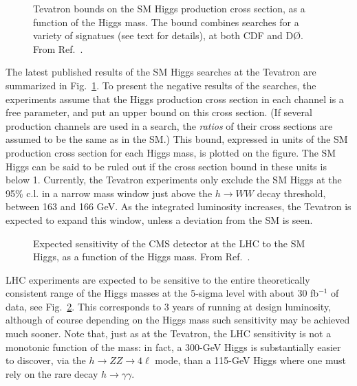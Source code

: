 \documentclass{ws-procs9x6}
\begin{document}
\begin{figure}
\begin{center}
\end{center}
\caption{Tevatron bounds on the SM Higgs production cross section, as a function of the Higgs mass. The bound combines searches for a variety of signatues (see text for details), at both CDF and D{\O}. From Ref.~\cite{TeV_Hbound}.}
\label{fig:TeV_Hbound}
\end{figure}

The latest published results of the SM Higgs searches at the Tevatron are summarized in Fig.~\ref{fig:TeV_Hbound}. To present the negative results of the searches, the experiments assume that the Higgs production cross section in each channel is a free parameter, and put an upper bound on this cross section. (If several production channels are used in a search, the {\it ratios} of their cross sections are assumed to be the same as in the SM.) This bound, expressed in units of the SM production cross section for each Higgs mass, is plotted on the figure. The SM Higgs can be said to be ruled out if the cross section bound in these units is below 1. Currently, the Tevatron experiments only exclude the SM Higgs at the 95\% c.l. in a narrow mass window just above the $h\to WW$ decay threshold, between 163 and 166 GeV. As the integrated luminosity increases, the Tevatron is expected to expand this window, unless a deviation from the SM is seen. 

\begin{figure}
\begin{center}
\end{center}
\caption{Expected sensitivity of the CMS detector at the LHC to the SM Higgs, as a function of the Higgs mass. From Ref.~\cite{CMS_TDR}.}
\label{fig:LHC_Hsens}
\end{figure}

LHC experiments are expected to be sensitive to the entire theoretically consistent range of the Higgs masses at the 5-sigma level with about 30 fb$^{-1}$ of data, see Fig.~\ref{fig:LHC_Hsens}. This corresponds to 3 years of running at design luminosity, although of course depending on the Higgs mass such sensitivity may be achieved much sooner. Note that, just as at the Tevatron, the LHC sensitivity is not a monotonic function of the mass: in fact, a 300-GeV Higgs is substantially easier to discover, via the $h\to ZZ \to 4\ell$ mode, than a 115-GeV Higgs where one must rely on the rare decay $h\to\gamma\gamma$. 
\end{document}
